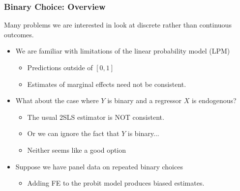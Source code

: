 

\begin{frame}
\frametitle{Binary Choice: Overview}
Many problems we are interested in look at discrete rather than continuous outcomes.
\begin{itemize}
\item We are familiar with limitations of the linear probability model (LPM)
\begin{itemize}
\item Predictions outside of $[0,1]$
\item Estimates of marginal effects need not be consistent.
\end{itemize}
\item What about the case where $Y$ is binary and a regressor $X$ is endogenous?
\begin{itemize}
\item The usual 2SLS estimator is \alert{NOT consistent}.
\item Or we can ignore the fact that $Y$ is binary...
\item Neither seems like a good option
\end{itemize}
\item Suppose we have panel data on repeated binary choices
\begin{itemize}
\item Adding FE to the probit model produces biased estimates.
\end{itemize}
\end{itemize}
\end{frame}



